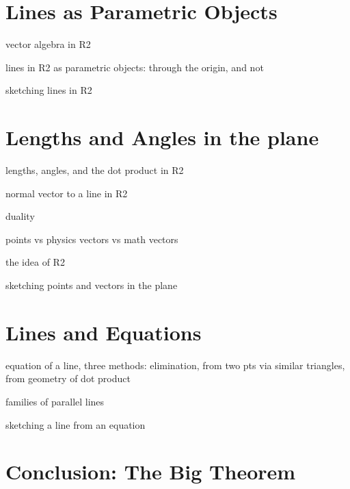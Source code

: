 \documentclass[00-livre-main.tex]{subfiles}
\begin{document}
\section*{Lines as Parametric Objects}

\begin{compactitem}
\item vector algebra in R2
\item lines in R2 as parametric objects: through the origin, and not
\item sketching lines in R2
\end{compactitem}

\section*{Lengths and Angles in the plane}
\begin{compactitem}
\item lengths, angles, and the dot product in R2
\item normal vector to a line in R2
\item duality
\end{compactitem}


\begin{compactitem}
\item points vs physics vectors vs math vectors
\item the idea of R2
\item sketching points and vectors in the plane
\end{compactitem}


\section*{Lines and Equations}
\begin{compactitem}
\item equation of a line, three methods: elimination, from two pts via similar triangles, from geometry of dot product
\item families of parallel lines
\item sketching a line from an equation
\end{compactitem}

\section*{Conclusion: The Big Theorem}
\end{document}
